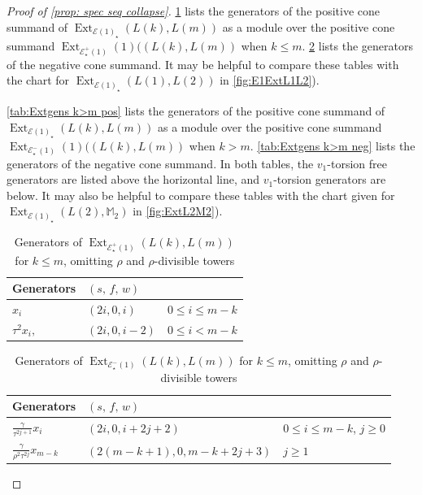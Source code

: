 \documentclass{amsart}
\theoremstyle{plain}
\numberwithin{equation}{section}
\numberwithin{figure}{section}
\DeclareMathOperator{\Ext}{Ext}
\newcommand{\mM}{{\mathbb M}}
\newcommand{\cE}{{\mathcal E}}
\newcommand{\0}{\langle 0 \rangle }
\begin{document}
\begin{proof}[Proof of \cref{prop: spec seq collapse}]
\cref{tab:Extgens k<m pos} lists the generators of the positive cone summand of $\Ext_{\cE (1)_\star} (L(k), L(m))$ as a module over the positive cone summand $\Ext_{\cE^{+}_{\star}(1)}(1)((L(k), L(m))$ when $k \le m$. \cref{tab:Extgens k<m neg} lists the generators of the negative cone summand. It may be helpful to compare these tables with the chart for $\Ext_{\cE (1)_\star} (L(1), L(2))$ in \cref{fig:E1ExtL1L2}). 

\cref{tab:Extgens k>m pos} lists the generators of the positive cone summand of $\Ext_{\cE (1)_\star} (L(k), L(m))$ as a module over the positive cone summand $\Ext_{\cE^{-}_{\star}(1)}(1)((L(k), L(m))$ when $k > m.$ \cref{tab:Extgens k>m neg} lists the generators of the negative cone summand. In both tables, the $v_{1}$-torsion free generators are listed above the horizontal line, and $v_{1}$-torsion generators are below. It may also be helpful to compare these tables with the chart given for $\Ext_{\cE (1)_\star} (L(2), \mM_2)$ in \cref{fig:ExtL2M2}).

\begin{table}[h!] 
    \centering
    \begin{tabular}{l |l |l}
            Generators & $(s,\, f,\, w)$ & \\
            \hline
            $x_{i}$ & $(2i, 0, i)$ & $0 \le i \le m-k$ \\
            $\tau^{2}x_{i},$ & $(2i, 0, i-2)$ & $0 \le i < m-k$ \\
    \end{tabular}
    \caption{Generators of $\Ext_{\cE^{+}_{\star}(1)} (L(k), L(m))$ for $k \le m$, omitting $\rho$ and $\rho$-divisible towers}
    \label{tab:Extgens k<m pos}
\end{table}

\begin{table}[h!] 
    \centering
    \begin{tabular}{l |l |l}
            Generators & $(s,\, f,\, w)$ & \\
            \hline
            $\frac{\gamma}{\tau^{2j+1}}x_{i}$ & $(2i, 0, i + 2j + 2)$ & $0 \le i \le m-k$, $j \ge 0$ \\
            $\frac{\gamma}{\rho^{2}\tau^{2j}}x_{m-k}$ & $(2(m-k+1), 0, m-k + 2j + 3)$ & $j \ge1 $ \\
    \end{tabular}
    \caption{Generators of $\Ext_{\cE^{-}_{\star}(1)} (L(k), L(m))$ for $k \le m$, omitting $\rho$ and $\rho$-divisible towers}
    \label{tab:Extgens k<m neg}
\end{table}


\end{proof}
\end{document}
